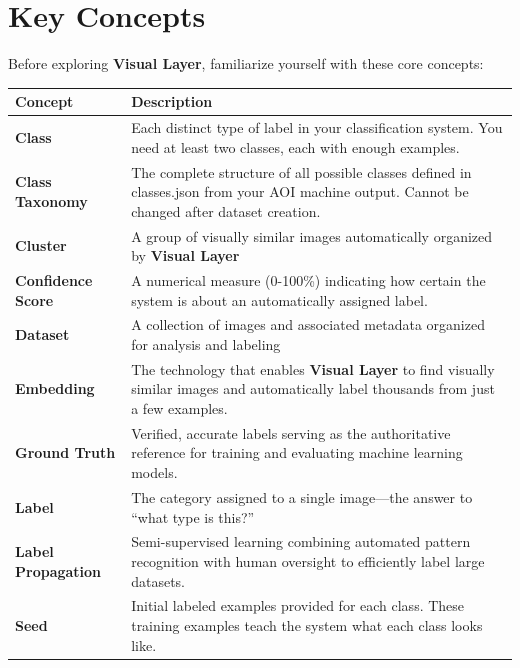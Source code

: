 \documentclass[
  11pt,
  a4paper,
  11pt,
  oneside]{report}
\renewcommand{\toprule}{\hline}
\renewcommand{\midrule}{\hline}
\renewcommand{\bottomrule}{\hline}
\begin{document}
\section{Key Concepts}\label{key-concepts}

Before exploring \textbf{Visual Layer}, familiarize yourself with these
core concepts:

\begin{longtable}[]{@{}
  >{\raggedright\arraybackslash}p{}
  >{\raggedright\arraybackslash}p{}@{}}
\toprule\noalign{}
\begin{minipage}[b]{\linewidth}\raggedright
\textbf{Concept}
\end{minipage} & \begin{minipage}[b]{\linewidth}\raggedright
\textbf{Description}
\end{minipage} \\
\midrule\noalign{}
\endhead
\bottomrule\noalign{}
\endlastfoot
\textbf{Class} & Each distinct type of label in your classification
system. You need at least two classes, each with enough examples. \\
\textbf{Class Taxonomy} & The complete structure of all possible classes
defined in classes.json from your AOI machine output. Cannot be changed
after dataset creation. \\
\textbf{Cluster} & A group of visually similar images automatically
organized by \textbf{Visual Layer} \\
\textbf{Confidence Score} & A numerical measure (0-100\%) indicating how
certain the system is about an automatically assigned label. \\
\textbf{Dataset} & A collection of images and associated metadata
organized for analysis and labeling \\
\textbf{Embedding} & The technology that enables \textbf{Visual Layer}
to find visually similar images and automatically label thousands from
just a few examples. \\
\textbf{Ground Truth} & Verified, accurate labels serving as the
authoritative reference for training and evaluating machine learning
models. \\
\textbf{Label} & The category assigned to a single image---the answer to
``what type is this?'' \\
\textbf{Label Propagation} & Semi-supervised learning combining
automated pattern recognition with human oversight to efficiently label
large datasets. \\
\textbf{Seed} & Initial labeled examples provided for each class. These
training examples teach the system what each class looks like. \\
\end{longtable}
\end{document}
